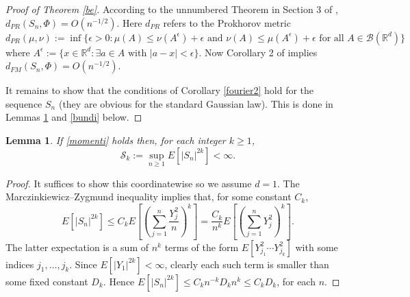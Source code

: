 \documentclass{article}
\newtheorem{lemma}[theorem]{Lemma}
\begin{document}
\begin{proof}[Proof of Theorem \ref{be}]
According to the unnumbered Theorem in Section 3 of \cite{yurinskii}, $d_{PR}(S_{n},\Phi)=O(n^{-1/2})$.
Here $d_{PR}$ refers to the Prokhorov metric
$$
d_{PR}(\mu,\nu):=\inf\{\epsilon>0: \mu(A)\leq \nu(A^{\epsilon})+\epsilon\mbox{ and }
\nu(A)\leq \mu(A^{\epsilon})+\epsilon\mbox{ for all }A\in\mathcal{B}(\mathbb{R}^{d})\}
$$
where $A^{\epsilon}:=\{x\in\mathbb{R}^{d}:\exists a\in A \mbox{ with }|a-x|<\epsilon\}$.
Now Corollary 2 of \cite{dudley} implies $d_{FM}(S_{n},\Phi)=O(n^{-1/2})$. 

It remains to show that the conditions
of Corollary \ref{fourier2} hold for the sequence $S_{n}$ (they are obvious for the standard Gaussian law). 
This is done in Lemmas \ref{boundy} and \ref{bundi} below.	
\end{proof}

\begin{lemma}\label{boundy}
If \eqref{momenti} holds then, for each integer $k\geq 1$,
$$
\mathcal{S}_{k}:=\sup_{n\geq 1}E[|S_{n}|^{2k}]<\infty.
$$
\end{lemma}
\begin{proof} It suffices to show this coordinatewise so
we assume $d=1$.
The Mar\-czin\-ki\-e\-wicz--Zygmund inequality implies that, for some constant $C_{k}$,
$$
E[|S_{n}|^{2k}]\leq C_{k}E \left[\left(\sum_{j=1}^{n} \frac{Y^{2}_{j}}{n}\right)^{k}\right]=
\frac{C_{k}}{n^{k}}E \left[\left(\sum_{j=1}^{n} Y^{2}_{j}\right)^{k}\right].
$$
The latter expectation is a sum of $n^{k}$ terms of the form $E[Y_{j_{1}}^{2}\cdots Y_{j_{k}}^{2}]$ with some
indices $j_{1},\ldots,j_{k}$. Since $E[|Y_{1}|^{2k}]<\infty$, clearly each such term is smaller than some
fixed constant $D_{k}$. Hence $E[|S_{n}|^{2k}]\leq {C_{k}}{n^{-k}}D_{k}n^{k}\leq C_{k}D_{k}$, for each $n$.
\end{proof}
\end{document}
